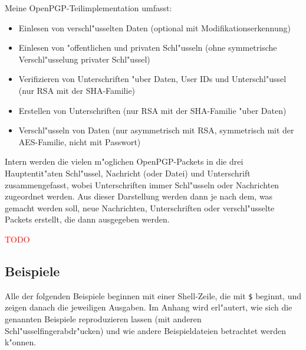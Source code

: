 \documentclass[12pt]{article}
\newcommand{\todo}[1]{\textcolor{red}{\mbox{TODO}}\marginpar{\textcolor{red}{#1}}}
\begin{document}
Meine OpenPGP-Teilimplementation umfasst:
\begin{itemize}
    \item Einlesen von verschl"usselten Daten (optional mit Modifikationserkennung)
    \item Einlesen von "offentlichen und privaten Schl"usseln (ohne symmetrische Verschl"usselung privater Schl"ussel)
    \item Verifizieren von Unterschriften "uber Daten, User IDs und Unterschl"ussel (nur RSA mit der SHA-Familie)
    \item Erstellen von Unterschriften (nur RSA mit der SHA-Familie "uber Daten)
    \item Verschl"usseln von Daten (nur asymmetrisch mit RSA, symmetrisch mit der AES-Familie, nicht mit Passwort)
\end{itemize}

Intern werden die vielen m"oglichen OpenPGP-Packets in die drei Hauptentit"aten
Schl"ussel, Nachricht (oder Datei) und Unterschrift zusammengefasst,
wobei Unterschriften immer Schl"usseln oder Nachrichten zugeordnet werden.
Aus dieser Darstellung werden dann je nach dem, was gemacht werden soll,
neue Nachrichten, Unterschriften oder verschl"usselte Packets erstellt,
die dann ausgegeben werden.

\todo{Mehr schreiben}

\subsection{Beispiele}
Alle der folgenden Beispiele beginnen mit einer Shell-Zeile, die mit \verb|$| beginnt,
und zeigen danach die jeweiligen Ausgaben.
Im Anhang wird erl"autert, wie sich die genannten Beispiele reproduzieren lassen
(mit anderen Schl"usselfingerabdr"ucken) und wie andere Beispieldateien betrachtet werden k"onnen.

\lstset{
breaklines,
basicstyle=\scriptsize\ttfamily,
language=none,
}
\end{document}
